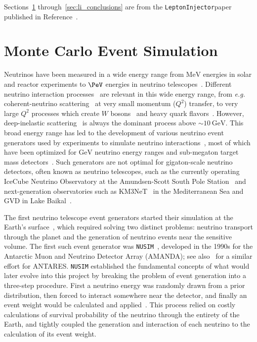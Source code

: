 \documentclass[main.tex]{subfiles}
\newcommand{\LeptonInjector}{\texttt{LeptonInjector}}
\newcommand{\nusim}{\texttt{NUSIM}}
\begin{document}
Sections~\ref{sec:mc_sim} through~\ref{sec:li_conclusions} are from the \LeptonInjector paper published in Reference~\cite{ABBASI2021108018}.

\section{Monte Carlo Event Simulation}\label{sec:mc_sim}

Neutrinos have been measured in a wide energy range from $\si\MeV$ energies in solar and reactor experiments to $\si\PeV$ energies in neutrino telescopes~\cite{Vitagliano:2019yzm}.
Different neutrino interaction processes~\cite{Formaggio:2013kya} are relevant in this wide energy range, from \textit{e.g.} coherent-neutrino scattering~\cite{Akimov1123} at very small momentum ($Q^2$) transfer, to very large $Q^2$ processes which create $W$ bosons~\cite{Glashow:1960zz,Seckel:1997kk,Alikhanov:2014uja,Zhou:2019vxt,Beacom:2019pzs} and heavy quark flavors~\cite{Barge:2016uzn}.
However, deep-inelastic scattering~\cite{Gandhi:1995tf} is always the dominant process above $\sim\SI{10}\GeV$.
This broad energy range has led to the development of various neutrino event generators used by experiments to simulate neutrino interactions~\cite{Hayato:2002sd,Andreopoulos:2009rq,Golan:2012rfa,Lalakulich:2011eh}, most of which have been optimized for $\si\GeV$ neutrino energy ranges and sub-megaton target mass detectors~\cite{Andreopoulos:2009rq}.
Such generators are not optimal for gigaton-scale neutrino detectors, often known as neutrino telescopes, such as the currently operating IceCube Neutrino Observatory at the Amundsen-Scott South Pole Station~\cite{Aartsen:2016nxy} and next-generation observatories such as KM3NeT~\cite{Adrian-Martinez:2016fdl} in the Mediterranean Sea and GVD in Lake Baikal~\cite{Avrorin:2018ijk}.

The first neutrino telescope event generators started their simulation at the Earth's surface~\cite{osti_5884484,Hill:1996hzh,Gazizov:2004va,Yoshida:2003js}, which required solving two distinct problems: neutrino transport through the planet and the generation of neutrino events near the sensitive volume.
The first such event generator was \nusim{}~\cite{Hill:1996hzh}, developed in the 1990s for the Antarctic Muon and Neutrino Detector Array (AMANDA); see also~\cite{Bailey:2002} for a similar effort for ANTARES. 
\nusim{} established the fundamental concepts of what would later evolve into this project by breaking the problem of event generation into a three-step procedure. 
First a neutrino energy was randomly drawn from a prior distribution, then forced to interact somewhere near the detector, and finally an event weight would be calculated and applied~\cite{Hill:1996hzh}.
This process relied on costly calculations of survival probability of the neutrino through the entirety of the Earth, and tightly coupled the generation and interaction of each neutrino to the calculation of its event weight.
\end{document}
